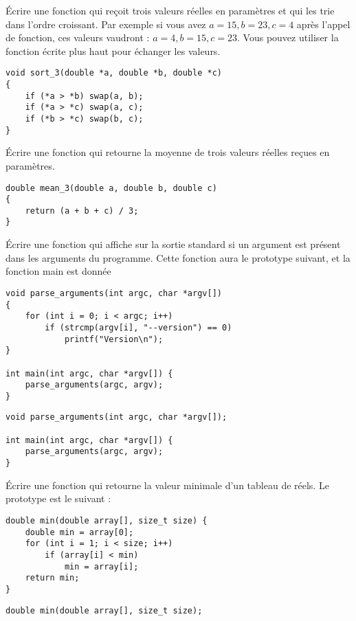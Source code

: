 \documentclass[french,a4paper,addpoints,11pt]{exam}
\begin{document}
\begin{questions}
\question Écrire une fonction qui reçoit trois valeurs réelles en paramètres et qui les trie dans l'ordre croissant. Par exemple si vous avez $a=15, b=23, c=4$ après l'appel de fonction, ces valeurs vaudront : $a=4, b=15, c=23$. Vous pouvez utiliser la fonction  écrite plus haut pour échanger les valeurs.

\begin{solutionordottedlines}[7cm]
\begin{lstlisting}
void sort_3(double *a, double *b, double *c)
{
    if (*a > *b) swap(a, b);
    if (*a > *c) swap(a, c);
    if (*b > *c) swap(b, c);
}
\end{lstlisting}
\end{solutionordottedlines}

\question Écrire une fonction qui retourne la moyenne de trois valeurs réelles reçues en paramètres.

\begin{solutionordottedlines}[6cm]
\begin{lstlisting}
double mean_3(double a, double b, double c)
{
    return (a + b + c) / 3;
}
\end{lstlisting}
\end{solutionordottedlines}

\question Écrire une fonction qui affiche  sur la sortie standard si un argument  est présent dans les arguments du programme. Cette fonction aura le prototype suivant, et la fonction main est donnée

\ifprintanswers
\begin{solution}
\begin{lstlisting}
void parse_arguments(int argc, char *argv[])
{
    for (int i = 0; i < argc; i++)
        if (strcmp(argv[i], "--version") == 0)
            printf("Version\n");
}

int main(int argc, char *argv[]) {
    parse_arguments(argc, argv);
}
\end{lstlisting}
\end{solution}
\else
\begin{lstlisting}
void parse_arguments(int argc, char *argv[]);

int main(int argc, char *argv[]) {
    parse_arguments(argc, argv);
}
\end{lstlisting}
\fillwithdottedlines{8cm}
\fi

\question Écrire une fonction qui retourne la valeur minimale d'un tableau de réels. Le prototype est le suivant :

\ifprintanswers
\begin{solution}
\begin{lstlisting}
double min(double array[], size_t size) {
    double min = array[0];
    for (int i = 1; i < size; i++)
        if (array[i] < min)
            min = array[i];
    return min;
}
\end{lstlisting}
\end{solution}
\else
\begin{lstlisting}
double min(double array[], size_t size);
\end{lstlisting}
\fillwithdottedlines{8cm}
\fi

\end{questions}
\end{document}
